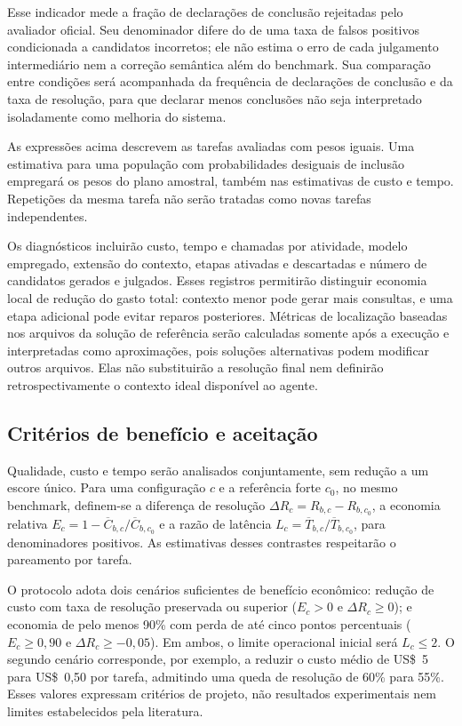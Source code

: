 Esse indicador mede a fração de declarações de conclusão rejeitadas pelo avaliador oficial. Seu denominador difere do de uma taxa de falsos positivos condicionada a candidatos incorretos; ele não estima o erro de cada julgamento intermediário nem a correção semântica além do benchmark. Sua comparação entre condições será acompanhada da frequência de declarações de conclusão e da taxa de resolução, para que declarar menos conclusões não seja interpretado isoladamente como melhoria do sistema.

As expressões acima descrevem as tarefas avaliadas com pesos iguais. Uma estimativa para uma população com probabilidades desiguais de inclusão empregará os pesos do plano amostral, também nas estimativas de custo e tempo. Repetições da mesma tarefa não serão tratadas como novas tarefas independentes.

Os diagnósticos incluirão custo, tempo e chamadas por atividade, modelo empregado, extensão do contexto, etapas ativadas e descartadas e número de candidatos gerados e julgados. Esses registros permitirão distinguir economia local de redução do gasto total: contexto menor pode gerar mais consultas, e uma etapa adicional pode evitar reparos posteriores. Métricas de localização baseadas nos arquivos da solução de referência serão calculadas somente após a execução e interpretadas como aproximações, pois soluções alternativas podem modificar outros arquivos. Elas não substituirão a resolução final nem definirão retrospectivamente o contexto ideal disponível ao agente.

\subsection{Critérios de benefício e aceitação}

Qualidade, custo e tempo serão analisados conjuntamente, sem redução a um escore único. Para uma configuração $c$ e a referência forte $c_0$, no mesmo benchmark, definem-se a diferença de resolução $\Delta R_c=R_{b,c}-R_{b,c_0}$, a economia relativa $E_c=1-\overline{C}_{b,c}/\overline{C}_{b,c_0}$ e a razão de latência $L_c=\overline{T}_{b,c}/\overline{T}_{b,c_0}$, para denominadores positivos. As estimativas desses contrastes respeitarão o pareamento por tarefa.

O protocolo adota dois cenários suficientes de benefício econômico: redução de custo com taxa de resolução preservada ou superior ($E_c>0$ e $\Delta R_c\geq0$); e economia de pelo menos 90\% com perda de até cinco pontos percentuais ($E_c\geq0{,}90$ e $\Delta R_c\geq-0{,}05$). Em ambos, o limite operacional inicial será $L_c\leq2$. O segundo cenário corresponde, por exemplo, a reduzir o custo médio de US\$~5 para US\$~0,50 por tarefa, admitindo uma queda de resolução de 60\% para 55\%. Esses valores expressam critérios de projeto, não resultados experimentais nem limites estabelecidos pela literatura.

